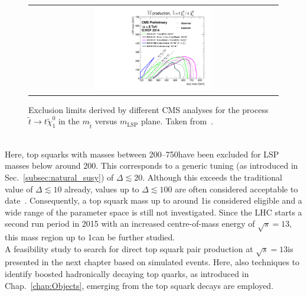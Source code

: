 \begin{figure}[!t]
  \centering
  \begin{tabular}{c}
                \includegraphics[width=0.49\textwidth]{figures/T2tt_ICHEP2014_All.pdf} 
  \end{tabular}
\caption{Exclusion limits derived by different CMS analyses for the process $\tilde{t} \rightarrow t\tilde{\chi}_1^0$ in the $m_{\tilde{t}}$ versus $m_\mathrm{LSP}$ plane. Taken from~\cite{bib:CMS:PhysicsResultsSUS}.} 
  \label{fig:8TeV_stop_limits}
\end{figure}
\\
Here, top squarks with masses between 200--750\gev have been excluded for LSP masses below around 200\gev. This corresponds to a generic tuning (as introduced in Sec.~\ref{subsec:natural_susy}) of $\Delta \lesssim 20$. Although this exceeds the traditional value of $\Delta \lesssim 10$ already, values up to $\Delta \lesssim 100$ are often considered acceptable to date~\cite{Craig:2013cxa}. Consequently, a top squark mass up to around 1\tev is considered eligible and a wide range of the parameter space is still not investigated. Since the LHC starts a second run period in 2015 with an increased centre-of-mass energy of $\sqrt{s} = 13$\tev, this mass region up to 1\tev can be further studied.\\
A feasibility study to search for direct top squark pair production at $\sqrt{s} = 13$\tev is presented in the next chapter based on simulated events. Here, also techniques to identify boosted hadronically decaying top quarks, as introduced in Chap.~\ref{chap:Objects}, emerging from the top squark decays are employed.
